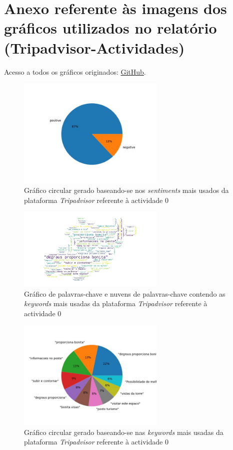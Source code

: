     \chapter{Anexo referente às imagens dos gráficos utilizados no relatório (Tripadvisor-Actividades)}
    
    Acesso a todos os gráficos originados: \href{https://github.com/CatKinKitKat/pi2021/tree/master/projecto/datascience/graphs/tripadvisor/activities}{GitHub}.
    
    \label{an1}
    \begin{figure}[!htb]
    \centering
    \includegraphics[width=7cm]{figuras/TripAdvisor/Activities/place0_sentiments.jpeg}
    \caption{Gráfico circular gerado baseando-se nos \textit{sentiments} mais usados da plataforma \textit{Tripadvisor} referente à actividade 0}
    \label{fig:exemplofig}
    \end{figure}
    
    \begin{figure}[!htb]
    \centering
    \includegraphics[width=7cm]{figuras/TripAdvisor/Activities/place0_keywordcloud.jpeg}
    \caption{Gráfico de palavras-chave e nuvens de palavras-chave contendo as \textit{keywords} mais usadas da plataforma \textit{Tripadvisor} referente à actividade 0}
    \label{fig:exemplofig}
    \end{figure}
    
    \begin{figure}[!htb]
    \centering
    \includegraphics[width=7cm]{figuras/TripAdvisor/Activities/place0_keywords.jpeg}
    \caption{Gráfico circular gerado baseando-se nas \textit{keywords} mais usadas da plataforma \textit{Tripadvisor} referente à actividade 0}
    \label{fig:exemplofig}
    \end{figure}
    
